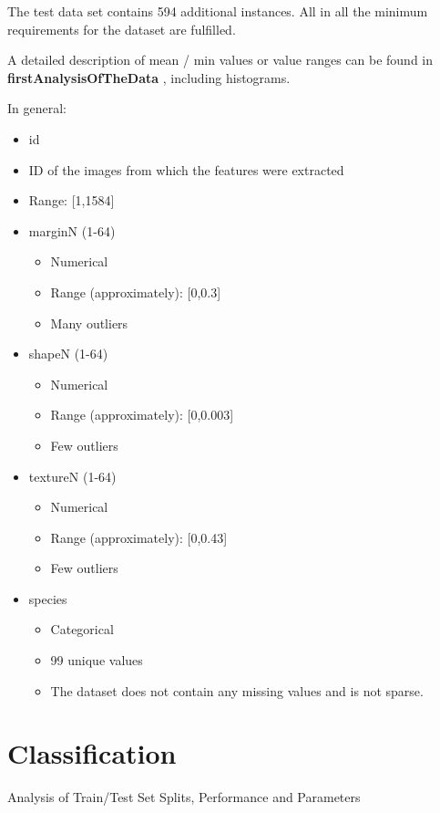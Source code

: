 \documentclass{sig-alternate-05-2015}
\begin{document}
The test data set contains 594 additional instances. All in all the minimum requirements for the dataset are fulfilled.


A detailed description of mean / min values or value ranges can be found in 
\textbf{firstAnalysisOfTheData}
, including histograms. 

In general:
\begin{itemize}
  \item id
  \item ID of the images from which the features were extracted
  \item Range: [1,1584]
  \item marginN (1-64)
  \begin{itemize}
	  \item Numerical
	  \item Range (approximately): [0,0.3]
	  \item Many outliers
  \end{itemize}
  \item shapeN (1-64)
  \begin{itemize}
 	  \item Numerical
	  \item Range (approximately): [0,0.003]
	  \item Few outliers
\end{itemize}
\item textureN (1-64)
	\begin{itemize}
		\item Numerical
	  \item Range (approximately): [0,0.43]
	  \item Few outliers
\end{itemize}

\item species
  \begin{itemize}
	\item Categorical
	  \item 99 unique values
	  \item The dataset does not contain any missing values and is not sparse.
\end{itemize}

\end{itemize}

\section{Classification}
Analysis of Train/Test Set Splits, Performance and Parameters
\end{document}
